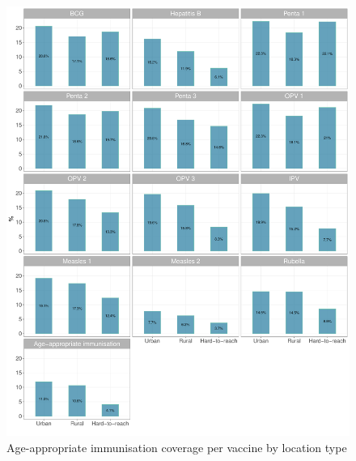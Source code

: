 \documentclass[12pt,a4paper]{article}
\begin{document}
\begin{figure}[H]

{\centering \includegraphics{kayahReport_files/figure-latex/epi3aPlot-1} 

}

\caption{Age-appropriate immunisation coverage per vaccine by location type}\label{fig:epi3aPlot}
\end{figure}
\end{document}
